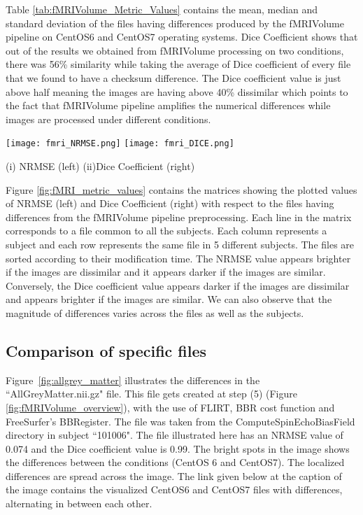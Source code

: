 Table \ref{tab:fMRIVolume_Metric_Values} contains the mean, median and standard deviation of the files having differences produced by the fMRIVolume pipeline on CentOS6 and CentOS7 operating systems. Dice Coefficient shows that out of the results we obtained from fMRIVolume processing on two conditions, there was 56\% similarity while taking the average of Dice coefficient of every file that we found to have a checksum difference. The Dice coefficient value is just above half meaning the images are having above 40\% dissimilar which points to the fact that fMRIVolume pipeline amplifies the numerical differences while images are processed under different conditions.

\begin{center}
\texttt{[image: fmri\_NRMSE.png]}%
\texttt{[image: fmri\_DICE.png]}
\caption*{(i) NRMSE (left) (ii)Dice Coefficient (right)}
\label{fig:fMRI_metric_values}
\end{center}

Figure \ref{fig:fMRI_metric_values} contains the matrices showing the plotted values of NRMSE (left) and Dice Coefficient (right) with respect to the files having differences from the fMRIVolume pipeline preprocessing. Each line in the matrix corresponds to a file common to all the subjects. Each column represents a subject and each row represents the same file in 5 different subjects. The files are sorted according to their modification time. The NRMSE value appears brighter if the images are dissimilar and it appears darker if the images are similar. Conversely, the Dice coefficient value appears darker if the images are dissimilar and appears brighter if the images are similar. We can also observe that the magnitude of differences varies across the files as well as the subjects.

\subsection{Comparison of specific files}
Figure~\ref{fig:allgrey_matter} illustrates the differences in the ``AllGreyMatter.nii.gz" file. This file gets created at step (5) (Figure \ref{fig:fMRIVolume_overview}), with the use of FLIRT, BBR cost function and FreeSurfer's BBRegister. The file was taken from the ComputeSpinEchoBiasField directory in subject ``101006". The file illustrated here has an NRMSE value of 0.074 and the Dice coefficient value is 0.99. The bright spots in the image shows the differences between the conditions (CentOS 6 and CentOS7). The localized differences are spread across the image. The link given below at the caption of the image contains the visualized CentOS6 and CentOS7 files with differences, alternating in between each other.


